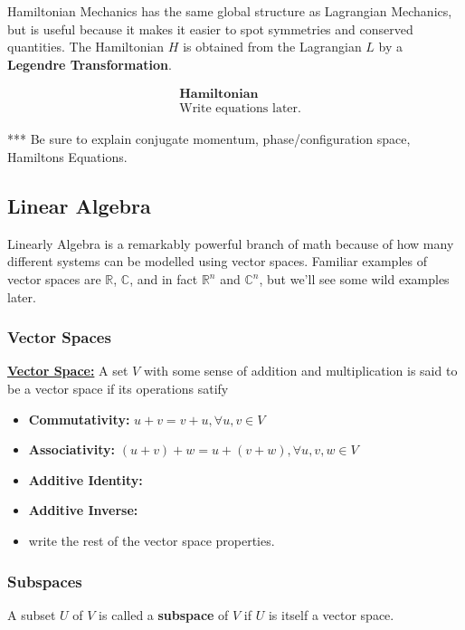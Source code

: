 \documentclass{article}
\newcommand{\R}{\mathbb{R}}
\newcommand{\C}{\mathbb{C}}
\begin{document}
\vskip 1cm
Hamiltonian Mechanics has the same global structure as Lagrangian Mechanics, but is useful because it makes it easier to spot symmetries and conserved quantities. The Hamiltonian $H$ is obtained from the Lagrangian $L$ by a \textbf{Legendre Transformation}.

\begin{align*}
  &\textbf{Hamiltonian} \\
  &\text{Write equations later.}
\end{align*}

\vskip 1cm
*** Be sure to explain conjugate momentum, phase/configuration space, Hamiltons Equations. 

\vskip 1cm
\subsection{Linear Algebra}

Linearly Algebra is a remarkably powerful branch of math because of how many different systems can be modelled using vector spaces. Familiar examples of vector spaces are $\R$, $\C$, and in fact $\R^n$ and $\C^n$, but we'll see some wild examples later.

\subsubsection{Vector Spaces}

\begin{dottedbox}
  \underline{\textbf{Vector Space:}} A set $V$ with some sense of addition and multiplication is said to be a vector space if its operations satify
  \begin{itemize}
    \item \textbf{Commutativity:} $u + v = v + u, \forall u, v \in V$
    \item \textbf{Associativity:} $(u + v) + w = u + (v + w), \forall u,v,w \in V$
    \item \textbf{Additive Identity:}
    \item \textbf{Additive Inverse:}
    \item write the rest of the vector space properties.
  \end{itemize}
\end{dottedbox}

\vskip 1cm

\subsubsection{Subspaces}
A subset $U$ of $V$ is called a \textbf{subspace} of $V$ if $U$ is itself a vector space.
\end{document}
